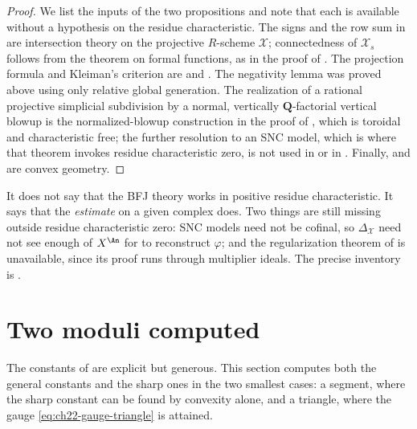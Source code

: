 \begin{proof}
We list the inputs of the two propositions and note that each is available
without a hypothesis on the residue characteristic.  The signs and the row
sum in  are intersection theory on the
projective \(R\)-scheme \(\mathcal X\); connectedness of \(\mathcal X_s\)
follows from the theorem on formal functions, as in the proof of
.  The projection formula and Kleiman's criterion
are  and \cite[Section~1.4]{KM08}.  The negativity
lemma  was proved above using only relative global
generation.  The realization of a rational projective simplicial subdivision
by a normal, vertically \(\mathbf Q\)-factorial vertical blowup is the
normalized-blowup construction in the proof of
, which is toroidal and characteristic free;
the further resolution to an SNC model, which is where that theorem invokes
residue characteristic zero, is not used in
 or in
.  Finally,
 and  are convex geometry.
\end{proof}

\begin{remark}
\label{rem:ch22-characteristic-free-caveat}
It does not say that the BFJ theory works in positive residue
characteristic.  It says that the \emph{estimate} on a given complex does.
Two things are still missing outside residue characteristic zero: SNC models
need not be cofinal, so \(\Delta_{\mathcal X}\) need not see enough of
\(X^{\An}\) for  to reconstruct
\(\varphi\); and the regularization theorem of
 is unavailable, since its proof runs through
multiplier ideals.  The precise inventory is
.
\end{remark}

\section{Two moduli computed}
\label{sec:ch22-worked-moduli}

The constants of 
are explicit but generous.  This section computes both the general constants
and the sharp ones in the two smallest cases: a segment, where the sharp
constant can be found by convexity alone, and a triangle, where the gauge
\eqref{eq:ch22-gauge-triangle} is attained.

